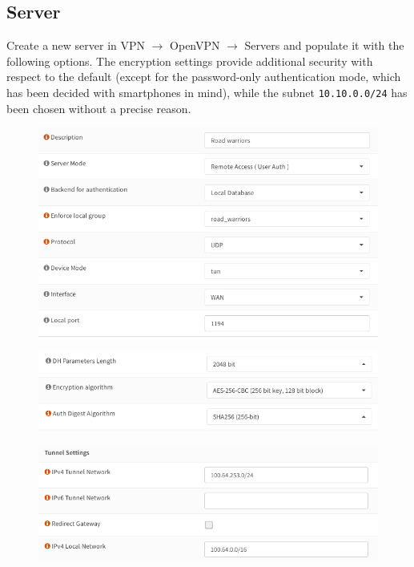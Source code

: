 \documentclass{homework}
\begin{document}
    \subsection{Server}
    Create a new server in VPN $\rightarrow$ OpenVPN $\rightarrow$ Servers and populate it with the following options.
    The encryption settings provide additional security with respect to the default (except for the password-only authentication mode, which has been decided with smartphones in mind), while the subnet \texttt{10.10.0.0/24} has been chosen without a precise reason.
    \begin{figure}[H]
        \centering
        \includegraphics[width=\linewidth]{openvpn/settings-general}
        \label{fig:openvpn-settings-general}
    \end{figure}
    \vspace{-20pt}
    \begin{figure}[H]
        \centering
        \includegraphics[width=\linewidth]{openvpn/settings-security}
        \label{fig:openvpn-settings-security}
    \end{figure}
    \vspace{-20pt}
    \begin{figure}[H]
        \centering
        \includegraphics[width=\linewidth]{openvpn/settings-tunnel}
        \label{fig:openvpn-settings-tunnel}
    \end{figure}
    \vspace{-20pt}
    
\end{document}
